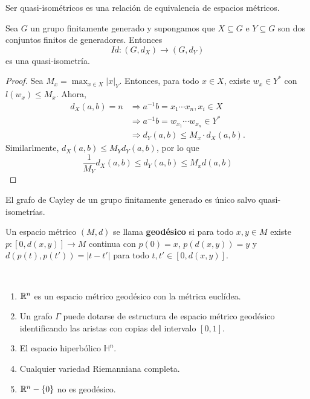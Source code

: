 \documentclass[twoside, 11pt]{article}
\begin{document}
\begin{coro}
Ser quasi-isométricos es una relación de equivalencia de espacios métricos.
\end{coro}

\begin{lemma}
Sea $G$ un grupo finitamente generado y supongamos que $X\subseteq G$ e $Y\subseteq G$ son dos conjuntos finitos de generadores. Entonces
\[
Id:(G,d_X)\to (G,d_Y)
\]
es una quasi-isometría.
\end{lemma}
\begin{proof}
Sea $M_x=\max_{x\in X} |x|_Y$. Entonces, para todo $x\in X$, existe $w_x\in Y^*$ con $l(w_x)\leq M_x$. Ahora, 
\begin{align*}
d_X(a,b)=n &\Rightarrow a^{-1}b=x_1\cdots x_n, x_i\in X\\
& \Rightarrow a^{-1}b=w_{x_1}\cdots w_{x_n}\in Y^*\\
& \Rightarrow d_Y(a,b)\leq M_x\cdot d_X(a,b).
\end{align*}
Similarlmente, $d_X(a,b)\leq M_Y d_Y(a,b)$, por lo que
\[
\frac{1}{M_Y}d_X(a,b)\leq d_Y(a,b)\leq M_xd(a,b)
\]
\end{proof}

\begin{coro}
El grafo de Cayley de un grupo finitamente generado es único salvo quasi-isometrías.
\end{coro}

\begin{defi}
Un espacio métrico $(M,d)$ se llama \textbf{geodésico} si para todo $x,y\in M$ existe $p:[0,d(x,y)]\to M$ continua con $p(0)=x$, $p(d(x,y))=y$ y $d(p(t),p(t'))=|t-t'|$ para todo $t,t'\in [0,d(x,y)]$. 
\end{defi}

\begin{ejs}\
\begin{enumerate}
\item $\mathbb{R}^n$ es un espacio métrico geodésico con la métrica euclídea.
\item Un grafo $\Gamma$ puede dotarse de estructura de espacio métrico geodésico identificando las aristas con copias del intervalo $[0,1]$. 
\item El espacio hiperbólico $\mathbb{H}^n$. 
\item Cualquier variedad Riemanniana completa.
\item $\mathbb{R}^n-\{0\}$ no es geodésico. 
\end{enumerate}
\end{ejs}
\end{document}
